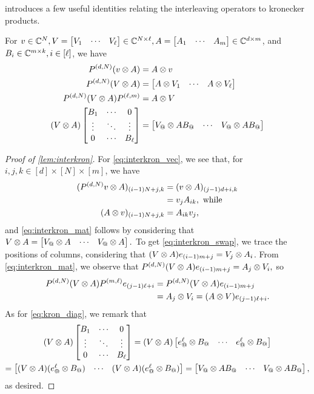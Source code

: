  introduces a few useful identities relating the interleaving operators to kronecker products.

\begin{lemma}\label{lem:interkron}
  For $v \in \mathbb{C}^N, V = \begin{bmatrix} V_{1} & \cdots & V_{\ell} \end{bmatrix} \in \mathbb{C}^{N \times \ell}, A = \begin{bmatrix} A_{1} & \cdots & A_{m} \end{bmatrix} \in \mathbb{C}^{d \times m}$, and $B_i \in \mathbb{C}^{m \times k}, i \in [\ell]$, we have
  \begin{align}
    P^{(d, N)} (v \kron A) &= A \kron v
    \label{eq:interkron_vec} \\
    P^{(d, N)} (V \kron A) &= \rowmat{A \kron V}{1}{\ell}
    \label{eq:interkron_mat} \\
    P^{(d, N)} (V \kron A) P^{(\ell, m)} &= A \kron V
    \label{eq:interkron_swap} \\
    (V \kron A) \diagmat{B}{1}{\ell} &= \rowmatfun{V_@ \kron A B_@}{1}{\ell}
    \label{eq:kron_diag}
  \end{align}
\end{lemma}

\begin{proof}[Proof of \cref{lem:interkron}]
  For \eqref{eq:interkron_vec}, we see that, for $i, j, k \in [d] \times [N] \times [m]$, we have
  \begin{align*}
    (P^{(d, N)} v \otimes A)_{(i - 1) N + j, k} &= (v \otimes A)_{(j - 1) d + i, k} \\
    &= v_j A_{i k}, \ \text{while} \\
    (A \otimes v)_{(i - 1) N + j, k} &= A_{i k} v_j,
  \end{align*}
  and \eqref{eq:interkron_mat} follows by considering that $V \otimes A = \rowmatfun{V_@ \kron A}{1}{\ell}.$  To get \eqref{eq:interkron_swap}, we trace the positions of columns, considering that $(V \otimes A) e_{(i - 1) m + j} = V_j \otimes A_i$.  From \eqref{eq:interkron_mat}, we observe that $P^{(d, N)} (V \otimes A) e_{(i - 1) m + j} = A_j \otimes V_i,$ so \begin{align*}
    P^{(d, N)} (V \otimes A) P^{(m, \ell)} e_{(j - 1) \ell + i} &= P^{(d, N)} (V \otimes A) e_{(i - 1) m + j} \\
    &= A_j \otimes V_i = (A \otimes V) e_{(j - 1) \ell + i}.
  \end{align*}
 As for \eqref{eq:kron_diag}, we remark that \begin{gather*} (V \kron A) \diagmat{B}{1}{\ell}%
    = (V \kron A) \rowmatfun{e^\ell_@ \kron B_@}{1}{\ell}  \\ = \rowmatfun{(V \kron A) (e_@^\ell \kron B_@)}{1}{\ell} = \rowmatfun{V_@ \kron A B_@}{1}{\ell},\end{gather*} as desired.
\end{proof}

